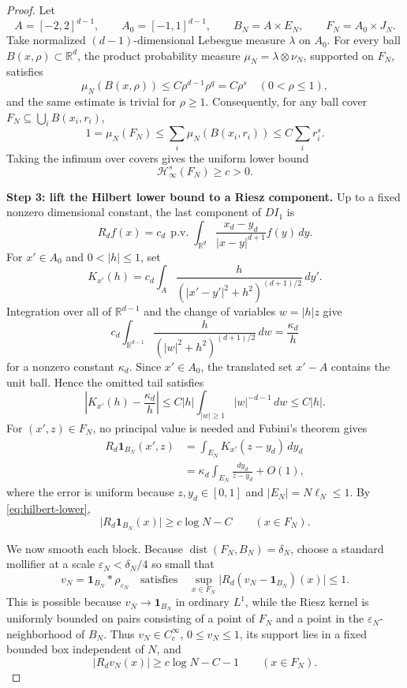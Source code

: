 \documentclass[11pt]{article}
\newcommand{\R}{\mathbb R}
\newcommand{\Hs}[1]{\mathcal H^{#1}_{\infty}}
\newcommand{\1}{\mathbf 1}
\begin{document}
\begin{proof}
Let
\[
 A=[-2,2]^{d-1},\qquad A_0=[-1,1]^{d-1},\qquad
 B_N=A\times E_N,\qquad F_N=A_0\times J_N.
\]
Take normalized $(d-1)$-dimensional Lebesgue measure $\lambda$ on $A_0$.
For every ball $B(x,\rho)\subset\R^d$, the product probability measure
$\mu_N=\lambda\otimes\nu_N$, supported on $F_N$, satisfies
\[
 \mu_N(B(x,\rho))\leq C\rho^{d-1}\rho^q=C\rho^s
 \quad(0<\rho\leq1),
\]
and the same estimate is trivial for $\rho\geq1$.  Consequently, for any
ball cover $F_N\subseteq\bigcup_iB(x_i,r_i)$,
\[
 1=\mu_N(F_N)\leq\sum_i\mu_N(B(x_i,r_i))
 \leq C\sum_i r_i^s.
\]
Taking the infimum over covers gives the uniform lower bound
\begin{equation}\label{eq:content-lower}
 \Hs{s}(F_N)\geq c>0.
\end{equation}

\medskip
\noindent\textbf{Step 3: lift the Hilbert lower bound to a Riesz component.}
Up to a fixed nonzero dimensional constant, the last component of $DI_1$ is
\[
 R_df(x)=c_d\,\operatorname{p.v.}\int_{\R^d}
 \frac{x_d-y_d}{\lvert x-y\rvert^{d+1}}f(y)\,dy.
\]
For $x'\in A_0$ and $0<\lvert h\rvert\leq1$, set
\[
 K_{x'}(h)=c_d\int_A
 \frac{h}{(\lvert x'-y'\rvert^2+h^2)^{(d+1)/2}}\,dy'.
\]
Integration over all of $\R^{d-1}$ and the change of variables
$w=\lvert h\rvert z$ give
\[
 c_d\int_{\R^{d-1}}
 \frac{h}{(\lvert w\rvert^2+h^2)^{(d+1)/2}}\,dw
 =\frac{\kappa_d}{h}
\]
for a nonzero constant $\kappa_d$.  Since $x'\in A_0$, the translated set
$x'-A$ contains the unit ball.  Hence the omitted tail satisfies
\[
 \left\lvert K_{x'}(h)-\frac{\kappa_d}{h}\right\rvert
 \leq C\lvert h\rvert
 \int_{\lvert w\rvert\geq1}\lvert w\rvert^{-d-1}\,dw
 \leq C\lvert h\rvert.
\]
For $(x',z)\in F_N$, no principal value is needed and Fubini's theorem gives
\begin{align*}
 R_d\1_{B_N}(x',z)
 &=\int_{E_N}K_{x'}(z-y_d)\,dy_d\\
 &=\kappa_d\int_{E_N}\frac{dy_d}{z-y_d}+O(1),
\end{align*}
where the error is uniform because $z,y_d\in[0,1]$ and
$\lvert E_N\rvert=N\ell_N\leq1$.  By \eqref{eq:hilbert-lower},
\begin{equation}\label{eq:riesz-block}
 \lvert R_d\1_{B_N}(x)\rvert\geq c\log N-C
 \qquad(x\in F_N).
\end{equation}

We now smooth each block.  Because
$\operatorname{dist}(F_N,B_N)=\delta_N$, choose a standard mollifier at a
scale $\varepsilon_N<\delta_N/4$ so small that
\[
 v_N=\1_{B_N}*\rho_{\varepsilon_N}
\quad\text{satisfies}\quad
 \sup_{x\in F_N}\lvert R_d(v_N-\1_{B_N})(x)\rvert\leq1.
\]
This is possible because $v_N\to\1_{B_N}$ in ordinary $L^1$, while the
Riesz kernel is uniformly bounded on pairs consisting of a point of $F_N$
and a point in the $\varepsilon_N$-neighborhood of $B_N$.  Thus
$v_N\in C_c^\infty$, $0\leq v_N\leq1$, its support lies in a fixed bounded
box independent of $N$, and
\begin{equation}\label{eq:smooth-block}
 \lvert R_dv_N(x)\rvert\geq c\log N-C-1
 \qquad(x\in F_N).
\end{equation}


\end{proof}
\end{document}
